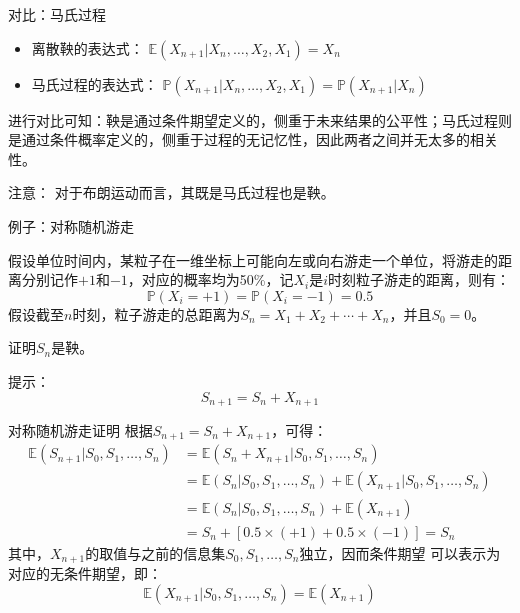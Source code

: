 \documentclass[t]{beamer}
\renewcommand{\Pr}{\mathbb{P}}
\newcommand{\E}{\mathbb{E}}
\begin{document}
      \begin{frame}{对比：马氏过程}
      \begin{itemize}
      \item 离散鞅的表达式：
      $\E(X_{n+1}|X_n,\ldots, X_2, X_1)=X_n$
      \item 马氏过程的表达式：
      $
      \Pr(X_{n+1}|X_n,\ldots, X_2, X_1)=\Pr(X_{n+1}|X_n)
      $
      \end{itemize}
      
      进行对比可知：鞅是通过条件期望定义的，侧重于未来结果的{\color{red}公平性}；马氏过程则是通过条件概率定义的，侧重于过程的{\color{blue}无记忆性}，因此两者之间并无太多的相关性。
      
      \begin{block}{注意：}
      对于布朗运动而言，其既是马氏过程也是鞅。
      \end{block}
      
      \end{frame}
      










      \begin{frame}{例子：对称随机游走}
      
        假设单位时间内，某粒子在一维坐标上可能向左或向右游走一个单位，将游走的距离分别记作$+1$和$-1$，对应的概率均为50\%，记$X_i$是$i$时刻粒子游走的距离，则有：
        \[\Pr(X_i=+1)=\Pr(X_i=-1)=0.5\]
        假设截至$n$时刻，粒子游走的总距离为$S_n=X_1+X_2+\cdots+X_n$，并且$S_0=0$。
        
        证明$S_n$是鞅。
   
        \begin{block}{提示：}
          $$S_{n+1}=S_n+X_{n+1}$$
        \end{block}
      \end{frame}

\begin{frame}{对称随机游走证明}
  根据$S_{n+1}=S_n+X_{n+1}$，可得：
  \[\begin{split}
    \E(S_{n+1}|S_0,S_1,\ldots, S_n)&= \E(S_n+X_{n+1}|S_0,S_1,\ldots, S_n)\\
    &=\E(S_n|S_0,S_1,\ldots, S_n)+\E(X_{n+1}|S_0,S_1,\ldots, S_n)\\
    &=\E(S_n|S_0,S_1,\ldots, S_n)+\E(X_{n+1})\\
    &=S_n+[0.5\times (+1)+0.5\times (-1)]=S_n
    \end{split}\]
  其中，$X_{n+1}$的取值与之前的信息集$S_0,S_1,\ldots, S_n$独立，因而条件期望
  可以表示为对应的无条件期望，即：
  \[\E(X_{n+1}|S_0,S_1,\ldots, S_n)=\E(X_{n+1})\]
\end{frame}
\end{document}
